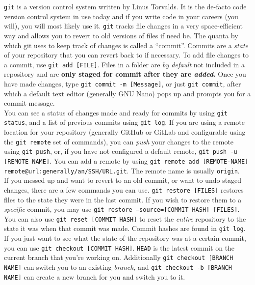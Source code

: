 \documentclass[a4paper,10pt]{article}
\begin{document}
\texttt{git} is a version control system written by Linus Torvalds. It is the de-facto code version control system in use today and if you write code in your careers (you will), you will most likely use it. \texttt{git} tracks file changes in a very space-efficient way and allows you to revert to old versions of files if need be. The quanta by which git uses to keep track of changes is called a ``commit''. Commits are a \emph{state} of your repository that you can revert back to if necessary. To add file changes to a commit, use \texttt{git add [FILE]}. Files in a folder are \emph{by default} not included in a repository and are \textbf{only staged for commit after they are \emph{added}.} Once you have made changes, type \texttt{git commit -m [Message]}, or just \texttt{git commit}, after which a default text editor (generally GNU Nano) pops up and prompts you for a commit message.
\\[10pt]
You can see a status of changes made and ready for commits by using \texttt{git status}, and a list of previous commits using \texttt{git log}. If you are using a remote location for your repository (generally GitHub or GitLab and configurable using the \texttt{git remote} set of commands), you can \emph{push} your changes to the remote using \texttt{git push}, or, if you have not configured a default remote, \texttt{git push -u [REMOTE NAME]}. You can add a remote by using \texttt{git remote add [REMOTE-NAME] remote@url:generally/an/SSH/URL.git}. The remote name is usually \texttt{origin}.
\\[10pt]
If you messed up and want to revert to an old commit, or want to undo staged changes, there are a few commands you can use. \texttt{git restore [FILES]} restores files to the state they were in the last commit. If you wish to restore them to a \emph{specific} commit, you may use \texttt{git restore --source=[COMMIT HASH] [FILES]}. You can also use \texttt{git reset [COMMIT HASH]} to reset the \emph{entire} repository to the state it was when that commit was made. Commit hashes are found in \texttt{git log}.
\\[10pt]
If you just want to see what the state of the repository was at a certain commit, you can use \texttt{git checkout [COMMIT HASH]}. \texttt{HEAD} is the latest commit on the current branch that you're working on. Additionally \texttt{git checkout [BRANCH NAME]} can switch you to an existing \emph{branch}, and \texttt{git checkout -b [BRANCH NAME]} can create a new branch for you and switch you to it.
\\[10pt]
\end{document}
